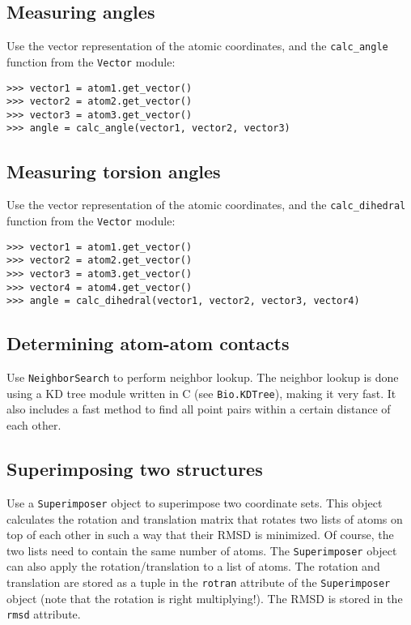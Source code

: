 \subsection{Measuring angles}
Use the vector representation of the atomic coordinates, and
the \texttt{calc\_angle} function from the \texttt{Vector} module:
\begin{verbatim}
>>> vector1 = atom1.get_vector()
>>> vector2 = atom2.get_vector()
>>> vector3 = atom3.get_vector()
>>> angle = calc_angle(vector1, vector2, vector3)
\end{verbatim}

\subsection{Measuring torsion angles}
Use  the vector representation of the atomic coordinates, and
the \texttt{calc\_dihedral} function from the \texttt{Vector} module:
\begin{verbatim}
>>> vector1 = atom1.get_vector()
>>> vector2 = atom2.get_vector()
>>> vector3 = atom3.get_vector()
>>> vector4 = atom4.get_vector()
>>> angle = calc_dihedral(vector1, vector2, vector3, vector4)
\end{verbatim}

\subsection{Determining atom-atom contacts}

Use \texttt{NeighborSearch} to perform neighbor lookup.
The neighbor lookup is done using a KD tree module written in C (see \texttt{Bio.KDTree}), making it very fast.
It  also includes a fast method to find all point pairs within a certain distance of each other.

\subsection{Superimposing two structures}

Use a \texttt{Superimposer} object to superimpose two coordinate sets.
This object calculates the rotation and translation matrix that rotates
two lists of atoms on top of each other in such a way that their RMSD
is minimized. Of course, the two lists need to contain the same number
of atoms. The \texttt{Superimposer} object can also apply the rotation/translation
to a list of atoms. The rotation and translation are stored as a tuple
in the \texttt{rotran} attribute of the \texttt{Superimposer} object
(note that the rotation is right multiplying!). The RMSD is stored
in the \texttt{rmsd} attribute.

